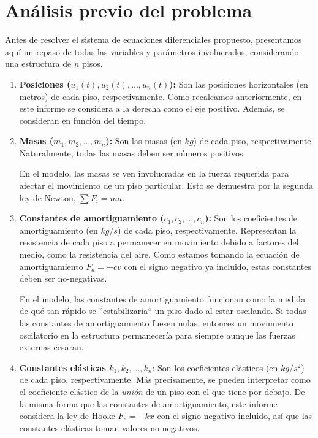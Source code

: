 \section{Análisis previo del problema}

Antes de resolver el sistema de ecuaciones diferenciales propuesto, presentamos aquí un repaso de todas las variables y parámetros involucrados, considerando una estructura de \(n\) pisos.

\begin{enumerate}
    \item \textbf{Posiciones (\(u_1(t), u_2(t), \ldots, u_n(t)\)):} Son las posiciones horizontales (en metros) de cada piso, respectivamente. Como recalcamos anteriormente, en este informe se considera a la derecha como el eje positivo. Además, se consideran en función del tiempo.

    \item \textbf{Masas (\(m_1, m_2, \ldots, m_n\)):} Son las masas (en \(\si{kg}\)) de cada piso, respectivamente. Naturalmente, todas las masas deben ser números positivos.

        En el modelo, las masas se ven involucradas en la fuerza requerida para afectar el movimiento de un piso particular. Esto se demuestra por la segunda ley de Newton, \(\sum F_i = ma\).

    \item \textbf{Constantes de amortiguamiento (\(c_1, c_2, \ldots, c_n\)):} Son los coeficientes de amortiguamiento (en \(kg/s\)) de cada piso, respectivamente. Representan la resistencia de cada piso a permanecer en movimiento debido a factores del medio, como la resistencia del aire. Como estamos tomando la ecuación de amortiguamiento \(F_a = -cv\) con el signo negativo ya incluido, estas constantes deben ser no-negativas.

        En el modelo, las constantes de amortiguamiento funcionan como la medida de qué tan rápido se ''estabilizaría`` un piso dado al estar oscilando. Si todas las constantes de amortiguamiento fuesen nulas, entonces un movimiento oscilatorio en la estructura permanecería para siempre aunque las fuerzas externas cesaran.

    \item \textbf{Constantes elásticas \(k_1, k_2, \ldots, k_n\)}: Son los coeficientes elásticos (en \(\si{kg/s^2}\)) de cada piso, respectivamente. Más precisamente, se pueden interpretar como el coeficiente elástico de la \textit{unión} de un piso con el que tiene por debajo. De la misma forma que las constantes de amortiguamiento, este informe considera la ley de Hooke \(F_e = -kx\) con el signo negativo incluido, así que las constantes elásticas toman valores no-negativos.


\end{enumerate}
